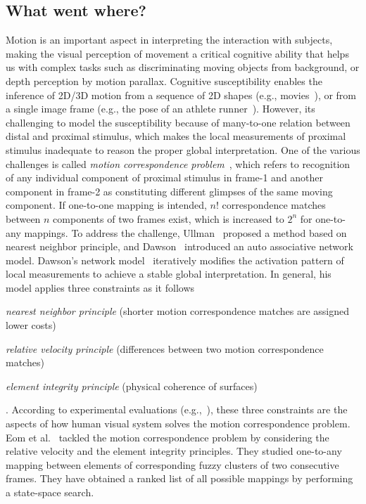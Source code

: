 \subsection{What went where?}
Motion is an important aspect in interpreting the interaction with subjects, making the visual perception of movement a critical cognitive ability that helps us with complex tasks such as discriminating moving objects from background, or depth perception by motion parallax. Cognitive susceptibility enables the inference of 2D/3D motion from a sequence of 2D shapes (e.g., movies~\cite{niyogi1994analyzing,little1998recognizing,hayfron2003automatic}), or from a single image frame (e.g., the pose of an athlete runner~\cite{wang2013learning,ramanan2006learning}). However, its challenging to model the susceptibility because of many-to-one relation between distal and proximal stimulus, which makes the local measurements of proximal stimulus inadequate to reason the proper global interpretation. One of the various challenges is called \textit{motion correspondence problem}~\cite{attneave1974apparent,ullman1979interpretation,ramachandran1986perception,dawson1991and}, which refers to recognition of any individual component of proximal stimulus in frame-1 and another component in frame-2 as constituting different glimpses of the same moving component. If one-to-one mapping is intended, $n!$ correspondence matches between $n$ components of two frames exist, which is increased to $2^n$  for one-to-any mappings. To address the challenge, Ullman~\cite{ullman1979interpretation} proposed a method based on nearest neighbor principle, and Dawson~\cite{dawson1991and} introduced an auto associative network model. Dawson's network model~\cite{dawson1991and} iteratively modifies the activation pattern of local measurements to achieve a stable global interpretation. In general, his model applies three constraints as it follows
\begin{inlinelist}
	\item \textit{nearest neighbor principle} (shorter motion correspondence matches are assigned lower costs)
	\item \textit{relative velocity principle} (differences between two motion correspondence matches)
	\item \textit{element integrity principle} (physical coherence of surfaces)
\end{inlinelist}.
According to experimental evaluations (e.g.,~\cite{ullman1979interpretation,ramachandran1986perception,cutting1982minimum}), these three constraints are the aspects of how human visual system solves the motion correspondence problem. Eom et al.~\cite{eom2012heuristic} tackled the motion correspondence problem by considering the relative velocity and the element integrity principles. They studied one-to-any mapping between elements of corresponding fuzzy clusters of two consecutive frames. They have obtained a ranked list of all possible mappings by performing a state-space search. 



